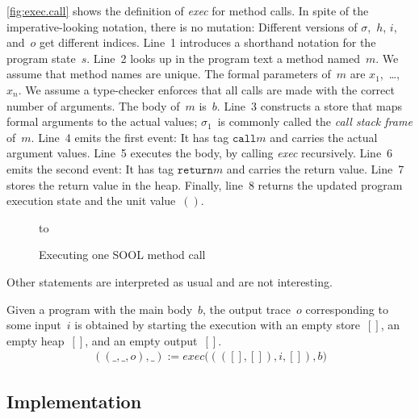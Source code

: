 \documentclass{sigplanconf} %
\theoremstyle{definition}
\theoremstyle{remark}
\begin{document}
\autoref{fig:exec.call} shows the definition of \textit{exec} for method calls.
In spite of the imperative-looking notation, there is no mutation:
Different versions of $\sigma$,~$h$, $i$, and~$o$ get different indices.
Line~1 introduces a shorthand notation for the program state~$s$.
Line~2 looks up in the program text a method named~$m$.
We assume that method names are unique.
The formal parameters of~$m$ are $x_1$,~\dots,~$x_n$.
We assume a type-checker enforces that all calls are made with the correct number of arguments.
The body of~$m$ is~$b$.
Line~3 constructs a store that maps formal arguments to the actual values;
$\sigma_1$~is commonly called the \emph{call stack frame} of~$m$.
Line~4 emits the first event:
It has tag $\mathtt{call}m$ and carries the actual argument values.
Line~5 executes the body, by calling \textit{exec} recursively.
Line~6 emits the second event:
It has tag $\mathtt{return}m$ and carries the return value.
Line~7 stores the return value in the heap.
Finally, line~8 returns the updated program execution state and the unit value~$()$.

\begin{figure}
\hbox to
\caption{Executing one SOOL method call}
\label{fig:exec.call}
\end{figure}

Other statements are interpreted as usual and are not interesting.

Given a program with the main body~$b$, the output trace~$o$ corresponding to some input~$i$ is obtained by starting the execution with an empty store~$[]$, an empty heap~$[]$, and an empty output~$[]$.
\begin{align}
((\_,\_,o),\_):=\mathit{exec}\bigl((([],[]),i,[]),b\bigr)
\end{align}

\subsection{Implementation}\label{sec:implementation} %
\end{document}
